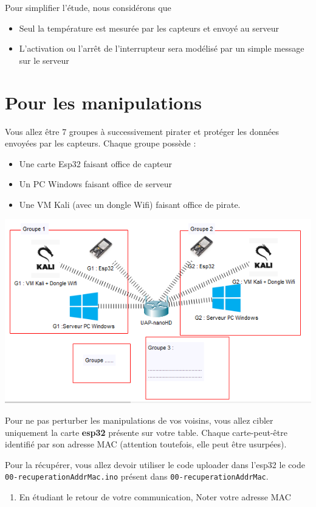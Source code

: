 \documentclass[french, 12pt]{article}%
\newcommand{\itemE}{\item[$\bullet$]}
\begin{document}
Pour simplifier l'étude, nous considérons que 
\begin{itemize}
\itemE Seul la température est mesurée par les capteurs et envoyé au serveur
\itemE L'activation ou l'arrêt de l'interrupteur sera modélisé par un simple message sur le serveur
\end{itemize}

\section{Pour les manipulations}
Vous allez être 7 groupes à successivement pirater et protéger les données envoyées par les capteurs. Chaque groupe possède : 
\begin{itemize}
\itemE Une carte Esp32 faisant office de capteur
\itemE Un PC Windows faisant office de serveur
\itemE Une VM Kali (avec un dongle Wifi) faisant office de pirate. 
\end{itemize}

\begin{center}
\includegraphics[scale=0.7]{./ressource/topologieActivite}
\end{center}


Pour ne pas perturber les manipulations de vos voisins, vous allez cibler uniquement la carte \textbf{esp32} présente sur votre table.  Chaque carte-peut-être identifié par son adresse MAC (attention toutefois, elle peut être usurpées). 

Pour la récupérer, vous allez devoir utiliser le code uploader dans l'esp32 le code \verb?00-recuperationAddrMac.ino? présent dans \verb?00-recuperationAddrMac?. 

\begin{enumerate}
\item En étudiant le retour de votre communication, Noter votre adresse MAC
\end{enumerate}
\end{document}

